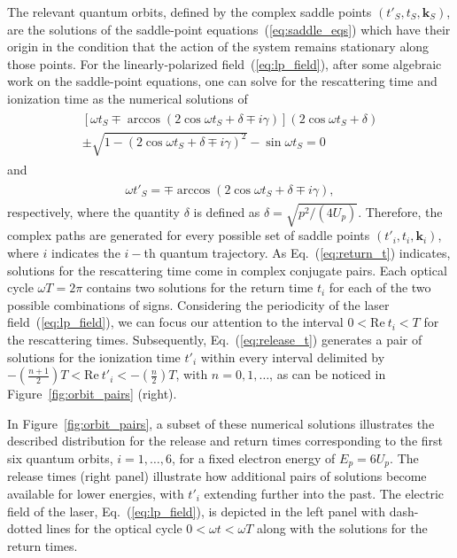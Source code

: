 The relevant quantum orbits, defined by the complex saddle points
$(t'_{S}, t_{S}, \mathbf{k}_{S})$, are the solutions of the
saddle-point equations~(\ref{eq:saddle_eqs}) which have their origin
in the condition that the action of the system remains stationary
along those points. For the linearly-polarized
field~(\ref{eq:lp_field}), after some algebraic work on the
saddle-point equations, one can solve for the rescattering time and
ionization time as the numerical solutions of~\cite{KopoldOptComm2000}
%
\begin{eqnarray}
  \label{eq:return_t}
  \begin{split}
    [\omega t_{S} \mp \arccos(2\cos\omega t_{S} + \delta \mp i\gamma)]
    (2\cos\omega t_{S} + \delta) \\
    \pm \sqrt{1 - (2\cos\omega t_{S} + \delta \mp i\gamma)^{2}} 
    - \sin\omega t_{S} = 0
  \end{split}
\end{eqnarray}
%
and
%
\begin{eqnarray}
  \label{eq:release_t}
  \begin{split}
    \omega t'_{S} = \mp \arccos(2\cos\omega t_{S} + \delta \mp i\gamma),
  \end{split}
\end{eqnarray}  
%
respectively, where the quantity $\delta$ is defined as $\delta =
\sqrt{p^{2} / (4U_{p})}$. Therefore, the complex paths are generated
for every possible set of saddle points $(t'_{i}, t_{i},
\mathbf{k}_{i})$, where $i$ indicates the $i-$th quantum
trajectory. As Eq.~(\ref{eq:return_t}) indicates, solutions for the
rescattering time come in complex conjugate pairs. Each optical cycle
$\omega T = 2\pi$ contains two solutions for the return time $t_{i}$
for each of the two possible combinations of signs.
Considering the periodicity of the laser field~(\ref{eq:lp_field}), we
can focus our attention to the interval $0 < \mathrm{Re}\ t_{i} < T$
for the rescattering times. Subsequently, Eq.~(\ref{eq:release_t})
generates a pair of solutions for the ionization time $t'_{i}$ within
every interval delimited by $-(\frac{n+1}{2}) T < \mathrm{Re}\ t'_{i}
< -(\frac{n}{2})T$, with $n = 0,1,\dots$, as can be noticed in
Figure~\ref{fig:orbit_pairs} (right).

In Figure~\ref{fig:orbit_pairs}, a subset of these numerical solutions
illustrates the described distribution for the release and return
times corresponding to the first six quantum orbits, $i = 1, \dots,
6$, for a fixed electron energy of $E_{p} = 6 U_{p}$.  The release
times (right panel) illustrate how additional pairs of solutions
become available for lower energies, with $t'_{i}$ extending further
into the past. The electric field of the laser,
Eq.~(\ref{eq:lp_field}), is depicted in the left panel with
dash-dotted lines for the optical cycle $0 < \omega t < \omega T$
along with the solutions for the return times.

